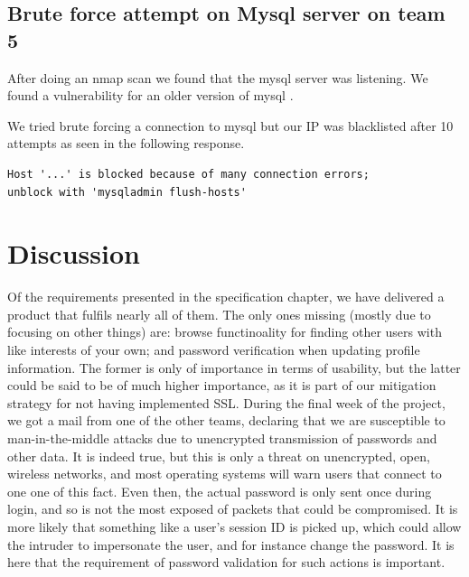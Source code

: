 \documentclass[a4paper]{article}
\begin{document}

\subsection{Brute force attempt on Mysql server on team 5}
After doing an nmap scan we found that the mysql server was listening.
We found a vulnerability for an older version of mysql \cite{Mysql2012}. 

We tried brute forcing a connection to mysql but our IP was blacklisted after 10 attempts as seen in the following response.
\begin{verbatim}
Host '...' is blocked because of many connection errors; 
unblock with 'mysqladmin flush-hosts'
\end{verbatim}

\section{Discussion}
Of the requirements presented in the specification chapter, we have delivered a product that fulfils nearly all of them. The only ones missing (mostly due to focusing on other things) are: browse functinoality for finding other users with like interests of your own; and password verification when updating profile information. The former is only of importance in terms of usability, but the latter could be said to be of much higher importance, as it is part of our mitigation strategy for not having implemented SSL. During the final week of the project, we got a mail from one of the other teams, declaring that we are susceptible to man-in-the-middle attacks due to unencrypted transmission of passwords and other data. It is indeed true, but this is only a threat on unencrypted, open, wireless networks, and most operating systems will warn users that connect to one one of this fact. Even then, the actual password is only sent once during login, and so is not the most exposed of packets that could be compromised. It is more likely that something like a user's session ID is picked up, which could allow the intruder to impersonate the user, and for instance change the password. It is here that the requirement of password validation for such actions is important.
\end{document}
